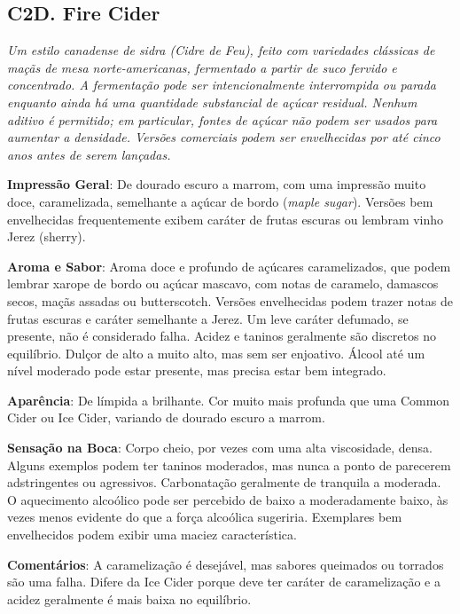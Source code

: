 \subsection*{C2D. Fire Cider}

\textit{Um estilo canadense de sidra (Cidre de Feu), feito com variedades clássicas de maçãs de mesa norte-americanas, fermentado a partir de suco fervido e concentrado. A fermentação pode ser intencionalmente interrompida ou parada enquanto ainda há uma quantidade substancial de açúcar residual. Nenhum aditivo é permitido; em particular, fontes de açúcar não podem ser usados para aumentar a densidade. Versões comerciais podem ser envelhecidas por até cinco anos antes de serem lançadas.}

\textbf{Impressão Geral}: De dourado escuro a marrom, com uma impressão muito doce, caramelizada, semelhante a açúcar de bordo (\textit{maple sugar}). Versões bem envelhecidas frequentemente exibem caráter de frutas escuras ou lembram vinho Jerez (sherry).

\textbf{Aroma e Sabor}: Aroma doce e profundo de açúcares caramelizados, que podem lembrar xarope de bordo ou açúcar mascavo, com notas de caramelo, damascos secos, maçãs assadas ou butterscotch. Versões envelhecidas podem trazer notas de frutas escuras e caráter semelhante a Jerez. Um leve caráter defumado, se presente, não é considerado falha. Acidez e taninos geralmente são discretos no equilíbrio. Dulçor de alto a muito alto, mas sem ser enjoativo. Álcool até um nível moderado pode estar presente, mas precisa estar bem integrado. 

\textbf{Aparência}: De límpida a brilhante. Cor muito mais profunda que uma Common Cider ou Ice Cider, variando de dourado escuro a marrom.

\textbf{Sensação na Boca}: Corpo cheio, por vezes com uma alta viscosidade, densa. Alguns exemplos podem ter taninos moderados, mas nunca a ponto de parecerem adstringentes ou agressivos. Carbonatação geralmente de tranquila a moderada. O aquecimento alcoólico pode ser percebido de baixo a moderadamente baixo, às vezes menos evidente do que a força alcoólica sugeriria. Exemplares bem envelhecidos podem exibir uma maciez característica.

\textbf{Comentários}: A caramelização é desejável, mas sabores queimados ou torrados são uma falha. Difere da Ice Cider porque deve ter caráter de caramelização e a acidez geralmente é mais baixa no equilíbrio. 

